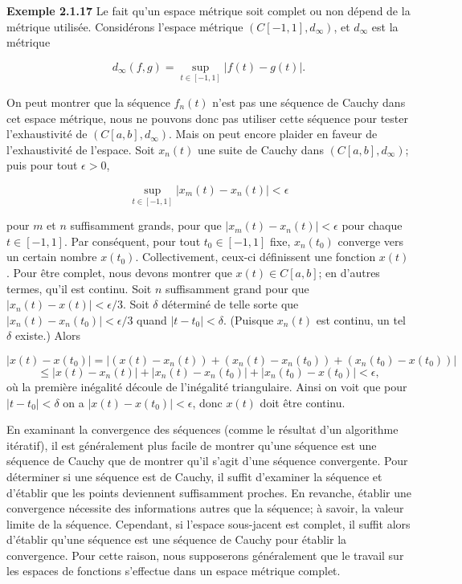 \documentclass[10pt,twoside,a4paper]{book}
\begin{document}
\vspace{4mm}
\noindent
\textbf{Exemple 2.1.17} Le fait qu'un espace métrique soit complet ou non dépend de la métrique utilisée. Considérons l'espace métrique $(C[-1, 1], d_\infty)$, et $d_\infty$ est la métrique

\begin{equation*}
  d_\infty(f, g) = \sup_{t \in [-1, 1]} |f(t) - g(t)|.
\end{equation*}

\noindent
On peut montrer que la séquence $f_n(t)$ n'est pas une séquence de Cauchy dans cet espace métrique, nous ne pouvons donc pas utiliser cette séquence pour tester l'exhaustivité de $(C[a, b], d_\infty)$. Mais on peut encore plaider en faveur de l'exhaustivité de l'espace. 
Soit $x_n(t)$ une suite de Cauchy dans $(C[a, b], d_\infty)$; puis pour tout $\epsilon > 0$,

\begin{equation*}
  \sup_{t \in [-1, 1]} |x_m(t) - x_n(t)| < \epsilon
\end{equation*}

\noindent
pour $m$ et $n$ suffisamment grands, pour que $|x_m(t) - x_n(t)| < \epsilon$ pour chaque $t \in [-1, 1]$. Par conséquent, pour tout $t_0 \in [-1, 1]$ fixe, $x_n(t_0)$ converge vers un certain nombre $x(t_0)$. Collectivement, ceux-ci définissent une fonction $x(t)$. 
Pour être complet, nous devons montrer que $x(t) \in C[a, b]$; en d'autres termes, qu'il est continu. Soit $n$ suffisamment grand pour que $|x_n(t) - x(t)| < \epsilon/3$. Soit $\delta$ déterminé de telle sorte que $|x_n(t) - x_n(t_0)| < \epsilon/3$ quand $|t - t_0| < \delta$. (Puisque $x_n(t)$ est continu, un tel $\delta$ existe.) Alors

\begin{equation*}
  |x(t) - x(t_0)| = |(x(t) - x_n(t)) + (x_n(t) - x_n(t_0)) + (x_n(t_0) - x(t_0))|
\end{equation*}
\begin{equation*}
  \leq |x(t) - x_n(t)| + |x_n(t) - x_n(t_0)| + |x_n(t_0) - x(t_0)| < \epsilon,
\end{equation*}
\noindent
où la première inégalité découle de l'inégalité triangulaire. Ainsi on voit que pour $|t - t_0| < \delta$ on a $|x(t) - x(t_0)| < \epsilon$, donc $x(t)$ doit être continu.
\vspace{2mm}

En examinant la convergence des séquences (comme le résultat d'un algorithme itératif), il est généralement plus facile de montrer qu'une séquence est une séquence de Cauchy que de montrer qu'il s'agit d'une séquence convergente. 
Pour déterminer si une séquence est de Cauchy, il suffit d'examiner la séquence et d'établir que les points deviennent suffisamment proches. En revanche, établir une convergence nécessite des informations autres que la séquence; 
à savoir, la valeur limite de la séquence. Cependant, si l'espace sous-jacent est complet, il suffit alors d'établir qu'une séquence est une séquence de Cauchy pour établir la convergence. Pour cette raison, nous supposerons 
généralement que le travail sur les espaces de fonctions s'effectue dans un espace métrique complet.
\end{document}

